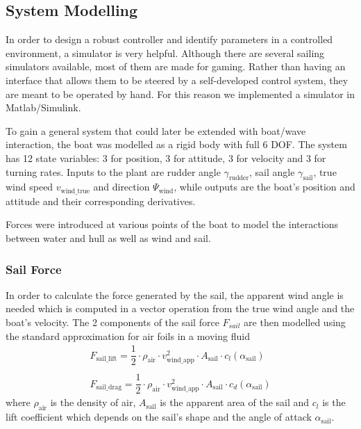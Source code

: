 \subsection{System Modelling} In order to design a robust controller and
identify parameters in a controlled environment, a simulator is very helpful.
Although there are several sailing simulators available, most of them are made
for gaming. Rather than having an interface that allows them to be steered by a
self-developed control system, they are meant to be operated by hand. For this
reason we implemented a simulator in Matlab/Simulink.

To gain a general system that could later be extended with boat/wave
interaction, the boat was modelled as a rigid body with full 6 DOF. The system
has 12 state variables: 3 for position, 3 for attitude, 3 for velocity and 3 for
turning rates.  Inputs to the plant are rudder angle
$\gamma_{\text{rudder}}$, sail angle $\gamma_{\text{sail}}$, true wind speed
$v_{\text{wind}\_\text{true}}$ and direction $\Psi_{\text{wind}}$, while
outputs are the boat's position and attitude and their corresponding
derivatives.

Forces were introduced at various points of the boat to model the interactions
between water and hull as well as wind and sail.
\subsubsection{Sail Force}
In order to calculate the force generated by the sail, the apparent wind angle is needed which is computed in a vector operation from the true wind angle and the boat's velocity. The 2 components of the sail force $F_{sail}$ are then modelled using the standard approximation for air foils in a moving fluid
\begin{equation} \label{eqn:air_foil_lift_drag}
\begin{array}{l}
  F_{\text{sail}\_\text{lift}} = \dfrac{1}{2}\cdot \rho_{\text{air}} \cdot v_{\text{wind}\_\text{app}}^2 \cdot A_{\text{sail}} \cdot c_l(\alpha_{\text{sail}})\\
\\
  F_{\text{sail}\_\text{drag}} = \dfrac{1}{2}\cdot \rho_{\text{air}} \cdot v_{\text{wind}\_\text{app}}^2 \cdot A_{\text{sail}} \cdot c_d(\alpha_{\text{sail}})
\end{array}
\end{equation}
where $\rho_{\text{air}}$ is the density of air, $A_{\text{sail}}$ is the
apparent area of the sail and $c_l$ is the lift coefficient which depends on
the sail's shape and the angle of attack $\alpha_{\text{sail}}$.
